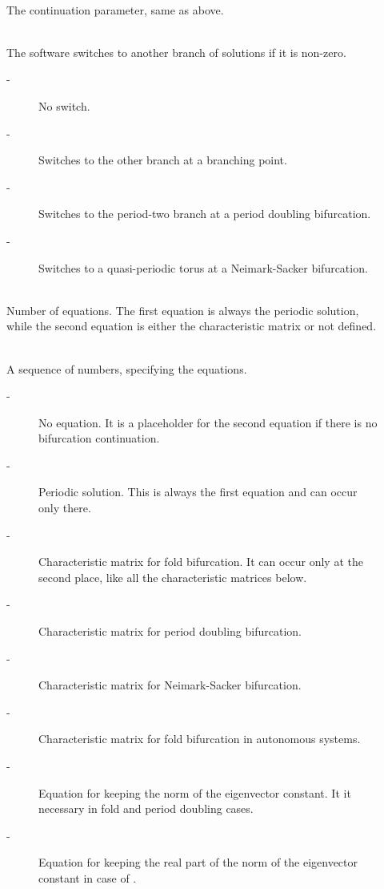 \documentclass[10pt,a4paper]{ddedoc}
\begin{document}
\begin{description}
\item[] ~\\
	The continuation parameter, same as above.
%
\item[] ~\\
	The software switches to another branch of solutions if it is non-zero.
\begin{description}
\item[ -] No switch.
\item[ -] Switches to the other branch at a branching point. %
\item[ -] Switches to the period-two branch at a period doubling bifurcation.
\item[ -] Switches to a quasi-periodic torus at a Neimark-Sacker bifurcation.
\end{description}
\item[] ~\\
	Number of equations. The first equation is always the periodic solution, 
	while the second equation is either the characteristic matrix or not defined.
\item[] ~\\
	A sequence of numbers, specifying the equations.
\begin{description}
\item[ -] No equation. It is a placeholder for the second equation if there is no bifurcation continuation.
\item[ -] Periodic solution. This is always the first equation and can occur only there.
\item[ -] Characteristic matrix for fold bifurcation. It can occur only at the second place, like all the characteristic matrices below.
\item[ -] Characteristic matrix for period doubling bifurcation.
\item[ -] Characteristic matrix for Neimark-Sacker bifurcation.
\item[ -] Characteristic matrix for fold bifurcation in autonomous systems.
\item[ -] Equation for keeping the norm of the eigenvector constant. It it necessary in fold and period doubling cases.
\item[ -] Equation for keeping the real part of the norm of the eigenvector constant in case of .

\end{description}
\end{description}
\end{document}
